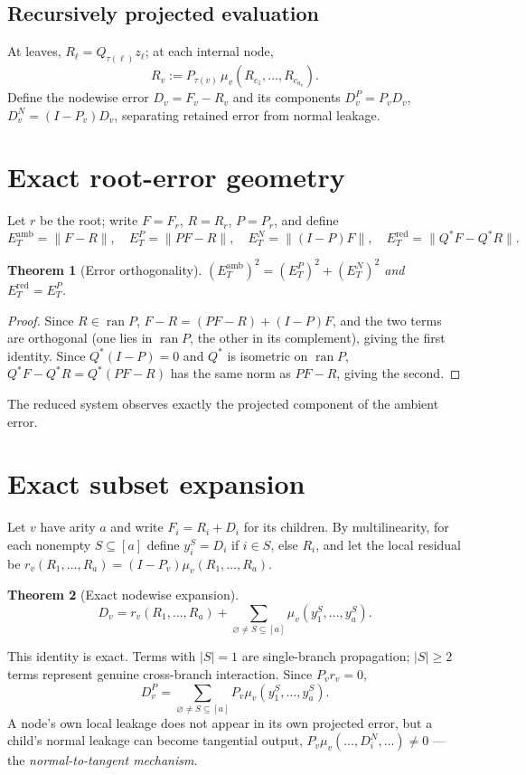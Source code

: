 \documentclass[11pt]{amsart}
\newtheorem{theorem}{Theorem}[section]
\theoremstyle{definition}
\theoremstyle{remark}
\DeclareMathOperator{\ran}{ran}
\begin{document}
\subsection{Recursively projected evaluation}

At leaves, $R_\ell = Q_{\tau(\ell)}z_\ell$; at each internal node,
\[
R_v := P_{\tau(v)}\,\mu_v(R_{c_1},\ldots,R_{c_{a_v}}).
\]
Define the nodewise error $D_v = F_v - R_v$ and its components
$D_v^P = P_v D_v$, $D_v^N = (I-P_v)D_v$, separating retained error from
normal leakage.

\section{Exact root-error geometry}
\label{sec:root-geometry}

Let $r$ be the root; write $F=F_r$, $R=R_r$, $P=P_r$, and define
\[
E_T^{\mathrm{amb}} = \lVert F-R\rVert,\quad
E_T^{P} = \lVert PF-R\rVert,\quad
E_T^{N} = \lVert (I-P)F\rVert,\quad
E_T^{\mathrm{red}} = \lVert Q^*F - Q^*R\rVert.
\]

\begin{theorem}[Error orthogonality]
\label{thm:orthogonality}
$(E_T^{\mathrm{amb}})^2 = (E_T^P)^2 + (E_T^N)^2$ and
$E_T^{\mathrm{red}} = E_T^P$.
\end{theorem}
\begin{proof}
Since $R\in\ran P$, $F-R = (PF-R)+(I-P)F$, and the two terms are
orthogonal (one lies in $\ran P$, the other in its complement), giving
the first identity. Since $Q^*(I-P)=0$ and $Q^*$ is isometric on
$\ran P$, $Q^*F-Q^*R = Q^*(PF-R)$ has the same norm as $PF-R$, giving
the second.
\end{proof}

The reduced system observes exactly the projected component of the
ambient error.

\section{Exact subset expansion}

Let $v$ have arity $a$ and write $F_i=R_i+D_i$ for its children. By
multilinearity, for each nonempty $S\subseteq[a]$ define
$y_i^S = D_i$ if $i\in S$, else $R_i$, and let the local residual be
$r_v(R_1,\ldots,R_a) = (I-P_v)\mu_v(R_1,\ldots,R_a)$.

\begin{theorem}[Exact nodewise expansion]
\label{thm:subset}
\[
D_v = r_v(R_1,\ldots,R_a) + \sum_{\varnothing\neq S\subseteq[a]} \mu_v(y_1^S,\ldots,y_a^S).
\]
\end{theorem}
This identity is exact. Terms with $\lvert S\rvert=1$ are single-branch
propagation; $\lvert S\rvert\ge 2$ terms represent genuine
cross-branch interaction. Since $P_v r_v = 0$,
\[
D_v^P = \sum_{\varnothing\neq S\subseteq[a]} P_v\mu_v(y_1^S,\ldots,y_a^S).
\]
A node's own local leakage does not appear in its own projected error,
but a child's normal leakage can become tangential output,
$P_v\mu_v(\ldots,D_i^N,\ldots)\neq 0$ — the \emph{normal-to-tangent
mechanism}.
\end{document}
